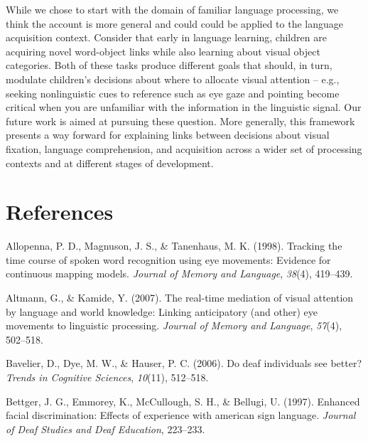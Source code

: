 \documentclass[english,floatsintext,man]{apa6}
\begin{document}
While we chose to start with the domain of familiar language processing,
we think the account is more general and could could be applied to the
language acquisition context. Consider that early in language learning,
children are acquiring novel word-object links while also learning about
visual object categories. Both of these tasks produce different goals
that should, in turn, modulate children's decisions about where to
allocate visual attention -- e.g., seeking nonlinguistic cues to
reference such as eye gaze and pointing become critical when you are
unfamiliar with the information in the linguistic signal. Our future
work is aimed at pursuing these question. More generally, this framework
presents a way forward for explaining links between decisions about
visual fixation, language comprehension, and acquisition across a wider
set of processing contexts and at different stages of development.

\newpage

\hypertarget{references}{%
\section{References}\label{references}}

\setlength{\parindent}{-0.5in}
\setlength{\leftskip}{0.5in}

\hypertarget{refs}{}
\leavevmode\hypertarget{ref-allopenna1998tracking}{}%
Allopenna, P. D., Magnuson, J. S., \& Tanenhaus, M. K. (1998). Tracking
the time course of spoken word recognition using eye movements: Evidence
for continuous mapping models. \emph{Journal of Memory and Language},
\emph{38}(4), 419--439.

\leavevmode\hypertarget{ref-altmann2007real}{}%
Altmann, G., \& Kamide, Y. (2007). The real-time mediation of visual
attention by language and world knowledge: Linking anticipatory (and
other) eye movements to linguistic processing. \emph{Journal of Memory
and Language}, \emph{57}(4), 502--518.

\leavevmode\hypertarget{ref-bavelier2006deaf}{}%
Bavelier, D., Dye, M. W., \& Hauser, P. C. (2006). Do deaf individuals
see better? \emph{Trends in Cognitive Sciences}, \emph{10}(11),
512--518.

\leavevmode\hypertarget{ref-bettger1997enhanced}{}%
Bettger, J. G., Emmorey, K., McCullough, S. H., \& Bellugi, U. (1997).
Enhanced facial discrimination: Effects of experience with american sign
language. \emph{Journal of Deaf Studies and Deaf Education}, 223--233.
\end{document}
